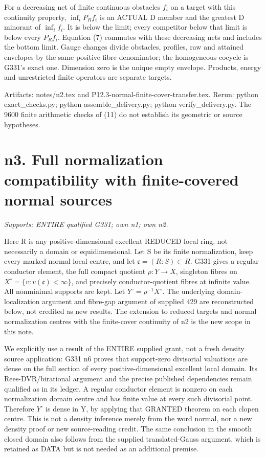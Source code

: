 \documentclass[11pt]{article}
\begin{document}
For a decreasing net of finite continuous obstacles $f_i$ on a target
with this continuity property, $\inf_iP_Rf_i$ is an ACTUAL D member
and the greatest D minorant of $\inf_i f_i$. It is below the limit;
every competitor below that limit is below every $P_Rf_i$. Equation
(7) commutes with these decreasing nets and includes the bottom limit.
Gauge changes divide obstacles, profiles, raw and attained envelopes
by the same positive fibre denominator; the homogeneous cocycle is
G331's exact one. Dimension zero is the unique empty envelope. Products,
energy and unrestricted finite operators are separate targets.

Artifacts: notes/n2.tex and P12.3-normal-finite-cover-transfer.tex.
Rerun: python exact\_checks.py; python assemble\_delivery.py;
python verify\_delivery.py. The 9600 finite arithmetic checks of (11)
do not establish its geometric or source hypotheses.

\section{n3. Full normalization compatibility with finite-covered normal sources}
\textit{Supports: ENTIRE qualified G331; own n1; own n2.}

Here R is any positive-dimensional excellent REDUCED local ring, not
necessarily a domain or equidimensional. Let S be its finite normalization,
keep every marked normal local centre, and let
$\mathfrak c=(R:S)\subset R$. G331 gives a regular conductor element,
the full compact quotient $\rho:Y\to X$, singleton fibres on
$X^\circ=\{v:v(\mathfrak c)<\infty\}$, and precisely conductor-quotient
fibres at infinite value. All nonminimal supports are kept. Let
$Y^\circ=\rho^{-1}X^\circ$. The underlying domain-localization argument
and fibre-gap argument of supplied 429 are reconstructed below, not
credited as new results. The extension to reduced targets and normal
normalization centres with the finite-cover continuity of n2 is the
new scope in this note.

We explicitly use a result of the ENTIRE supplied grant, not a fresh
density source application: G331 n6 proves that support-zero divisorial
valuations are dense on the full section of every positive-dimensional
excellent local domain. Its Rees-DVR/birational argument and the precise
published dependencies remain qualified as in its ledger. A regular
conductor element is nonzero on each normalization domain centre and has
finite value at every such divisorial point. Therefore $Y^\circ$ is dense
in Y, by applying that GRANTED theorem on each clopen centre. This is
not a density inference merely from the word normal, nor a new density
proof or new source-reading credit. The same conclusion in the smooth
closed domain also follows from the supplied translated-Gauss argument,
which is retained as DATA but is not needed as an additional premise.
\end{document}
